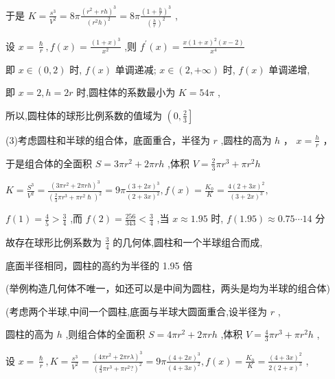 \documentclass[10pt]{article}
\begin{document}
于是 \(K = \frac{{s}^{3}}{{V}^{2}} = {8\pi }\frac{{\left( {r}^{2} + rh\right) }^{3}}{{\left( {r}^{2}h\right) }^{2}} = {8\pi }\frac{{\left( 1 + \frac{h}{r}\right) }^{3}}{{\left( \frac{h}{r}\right) }^{2}}\) ,

设 \(x = \frac{\hslash }{r},f\left( x\right)  = \frac{{\left( 1 + x\right) }^{3}}{{x}^{2}}\) ,则 \({f}^{\prime }\left( x\right)  = \frac{x{\left( 1 + x\right) }^{2}\left( {x - 2}\right) }{{x}^{4}}\)

即 \(x \in  \left( {0,2}\right)\) 时, \(f\left( x\right)\) 单调递减; \(x \in  \left( {2, + \infty }\right)\) 时, \(f\left( x\right)\) 单调递增,

即 \(x = 2,h = {2r}\) 时,圆柱体的系数最小为 \(K = {54\pi }\) ,

所以,圆柱体的球形比例系数的值域为 \(\left( {0,\frac{2}{3}}\right\rbrack\)

(3)考虑圆柱和半球的组合体，底面重合，半径为 \(r\) ,圆柱的高为 \(h\) ， \(x = \frac{h}{r}\) ，

于是组合体的全面积 \(S = {3\pi }{r}^{2} + {2\pi rh}\) ,体积 \(V = \frac{2}{3}\pi {r}^{3} + \pi {r}^{2}h\)

\(K = \frac{{S}^{3}}{{V}^{2}} = \frac{{\left( 3\pi {r}^{2} + 2\pi rh\right) }^{3}}{{\left( \frac{2}{3}\pi {r}^{3} + \pi {r}^{2}\hslash \right) }^{2}} = {9\pi }\frac{{\left( 3 + 2x\right) }^{3}}{{\left( 2 + 3x\right) }^{2}},f\left( x\right)  = \frac{{K}_{0}}{K} = \frac{4{\left( 2 + 3x\right) }^{2}}{{\left( 3 + 2x\right) }^{3}},\)

\(f\left( 1\right)  = \frac{4}{5} > \frac{3}{4}\) ,而 \(f\left( 2\right)  = \frac{256}{343} < \frac{3}{4}\) ,当 \(x \approx  {1.95}\) 时, \(f\left( {1.95}\right)  \approx  {0.75}\cdots {14}\) 分

故存在球形比例系数为 \(\frac{3}{4}\) 的几何体,圆柱和一个半球组合而成,

底面半径相同，圆柱的高约为半径的 1.95 倍

(举例构造几何体不唯一，如还可以是中间为圆柱，两头是均为半球的组合体)

(考虑两个半球,中间一个圆柱,底面与半球大圆面重合,设半径为 \(r\) ,

圆柱的高为 \(h\) ,则组合体的全面积 \(S = {4\pi }{r}^{2} + {2\pi rh}\) ,体积 \(V = \frac{4}{3}\pi {r}^{3} + \pi {r}^{2}h\) ,

设 \(x = \frac{\hslash }{r},K = \frac{{s}^{3}}{{V}^{2}} = \frac{{\left( 4\pi {r}^{2} + 2\pi r\lambda \right) }^{3}}{{\left( \frac{4}{3}\pi {r}^{3} + \pi {r}^{2}?\right) }^{2}} = {9\pi }\frac{{\left( 4 + 2x\right) }^{3}}{{\left( 4 + 3x\right) }^{2}},f\left( x\right)  = \frac{{K}_{0}}{K} = \frac{{\left( 4 + 3x\right) }^{2}}{2{\left( 2 + x\right) }^{3}}\) ,
\end{document}
